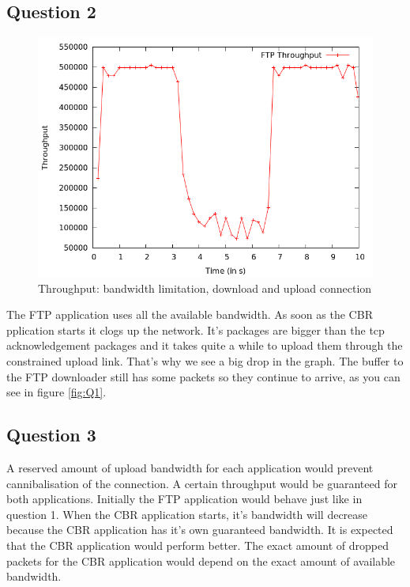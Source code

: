 \documentclass[11pt,a4paper]{article}
\begin{document}
\subsection{Question 2}
\begin{figure}[h!]
 \centering
 \includegraphics[width = 0.8\linewidth]{./output-ex1-part-2-1-7.png}
  \caption{Throughput: bandwidth limitation, download and upload connection}
 \label{fig:Q2}
\end{figure}
The FTP application uses all the available bandwidth. As soon as the CBR pplication starts it clogs up the network. It's packages are bigger than the tcp acknowledgement packages and it takes quite a while to upload them through the constrained upload link. That's why we see a big drop in the graph. The buffer to the FTP downloader still has some packets so they continue to arrive, as you can see in figure \ref{fig:Q1}.

\subsection{Question 3}
A reserved amount of upload bandwidth for each application would prevent cannibalisation of the connection. A certain throughput would be guaranteed for both applications. Initially the FTP application would behave just like in question 1. When the CBR application starts, it's bandwidth will decrease because the CBR application has it's own guaranteed bandwidth. It is expected that the CBR application would perform better. The exact amount of dropped packets for the CBR application would depend on the exact amount of available bandwidth.
\end{document}
